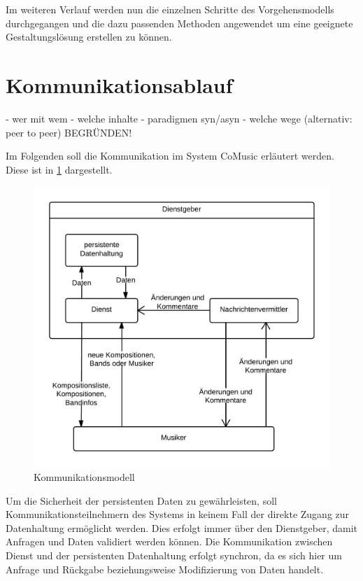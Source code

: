 \documentclass[12pt]{scrartcl}
\begin{document}
Im weiteren Verlauf werden nun die einzelnen Schritte des Vorgehensmodells durchgegangen und die dazu passenden Methoden angewendet um eine geeignete Gestaltungslösung erstellen zu können.


\section{Kommunikationsablauf}


- wer mit wem
- welche inhalte
- paradigmen syn/asyn
- welche wege (alternativ: peer to peer)
BEGRÜNDEN!

Im Folgenden soll die Kommunikation im System CoMusic erläutert werden. Diese ist in \ref{fig:kommunikationsmodell} dargestellt.

\begin{figure}
\centering
\includegraphics[scale=.25]{figures/kommunikationsmodell}
\caption{Kommunikationsmodell}
\label{fig:kommunikationsmodell}
\end{figure}

Um die Sicherheit der persistenten Daten zu gewährleisten, soll Kommunikationsteilnehmern des Systems in keinem Fall der direkte Zugang zur Datenhaltung ermöglicht werden. Dies erfolgt immer über den Dienstgeber, damit Anfragen und Daten validiert werden können. Die Kommunikation zwischen Dienst und der persistenten Datenhaltung erfolgt synchron, da es sich hier um Anfrage und Rückgabe beziehungsweise Modifizierung von Daten handelt.
\end{document}
